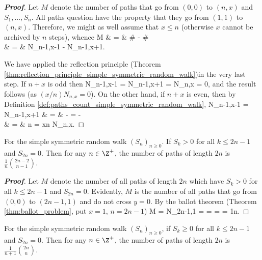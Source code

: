 \begin{proof}[\bf Proof]
Let $M$ denote the number of paths that go from $(0,0)$ to $(n,x)$ and $S_1,\dots,S_n$. All paths question have the property that they go from $(1,1)$ to $(n,x)$. Therefore, we might as well assume that $x\leq n$ (otherwise $x$ cannot be archived by $n$ steps), whence 
\beast
M & = & \# - \#\\
& = & N_{n-1,x-1} - N_{n-1,x+1}.
\eeast

We have applied the reflection principle (Theorem \ref{thm:reflection_principle_simple_symmetric_random_walk})in the very last step. If $n+x$ is odd then 
\be
N_{n-1,x-1} = N_{n-1,x+1} = N_{n,x} = 0,
\ee
and the result follows (as $(x/n)N_{n,x} = 0$). On the other hand, if $n+x$ is even, then by Definition \ref{def:paths_count_simple_symmetric_random_walk},
\beast
N_{n-1,x-1} = N_{n-1,x+1} & = &  -  =  -  \\
& = & n  = \frac xn N_{n,x}.
\eeast
\end{proof}

\begin{proposition}\label{pro:random_walk_number_paths_greater_than_zero}
For the simple symmetric random walk $(S_n)_{n\geq 0}$. If $S_k > 0$ for all $k\leq 2n-1$ and $S_{2n} = 0$. Then for any $n\in \Z^+$, the number of paths of length $2n$ is $\frac 1{n}\binom{2n-2}{n-1}$.
\end{proposition}

\begin{proof}[\bf Proof]
Let $M$ denote the number of all paths of length $2n$ which have $S_k>0$ for all $k\leq 2n-1$ and $S_{2n}=0$. Evidently, $M$ is the number of all paths that go from $(0,0)$ to $(2n-1,1)$ and do not cross $y=0$. By the ballot theorem (Theorem \ref{thm:ballot_problem}, put $x=1$, $n=2n-1$)
\be
M = N_{2n-1,1} =  =  =  = \frac 1n.
\ee
\end{proof}

\begin{proposition}\label{pro:random_walk_number_paths_greater_equal_than_zero}
For the simple symmetric random walk $(S_n)_{n\geq 0}$, if $S_k \geq 0$ for all $k\leq 2n-1$ and $S_{2n} = 0$. Then for any $n\in \Z^+$, the number of paths of length $2n$ is $\frac 1{n+1}\binom{2n}{n}$.
\end{proposition}

